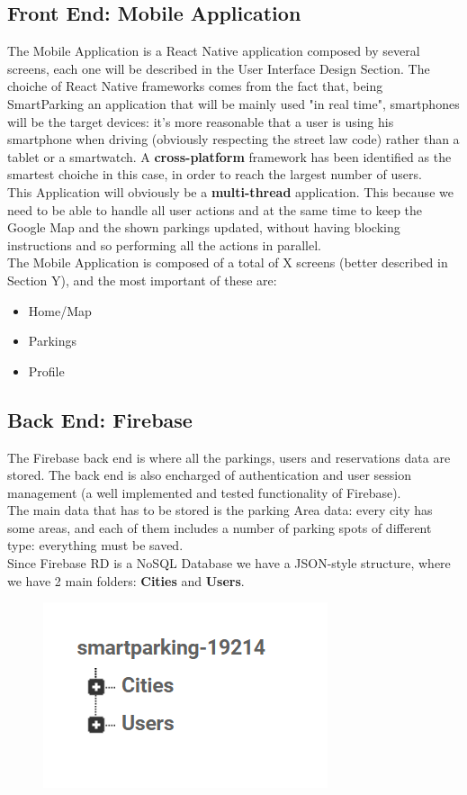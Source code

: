 \documentclass[11pt]{article} %
\begin{document}
\subsection{Front End: Mobile Application}
The Mobile Application is a React Native application composed by several screens, each one will be described in the User Interface Design Section. The choiche of React Native frameworks comes from the fact that, being SmartParking an application that will be mainly used "in real time", smartphones will be the target devices: it's more reasonable that a user is using his smartphone when driving (obviously respecting the street law code) rather than a tablet or a smartwatch. A \textbf{cross-platform} framework has been identified as the smartest choiche in this case, in order to reach the largest number of users.\\
This Application will obviously be a \textbf{multi-thread} application. This because we need to be able to handle all user actions and at the same time to keep the Google Map and the shown parkings updated, without having blocking instructions and so performing all the actions in parallel.\\
The Mobile Application is composed of a total of X screens (better described in Section Y), and the most important of these are:
\begin{itemize}
\item {Home/Map}
\item {Parkings}
\item {Profile}
\end{itemize}

\subsection{Back End: Firebase}
The Firebase back end is where all the parkings, users and reservations data are stored. The back end is also encharged of authentication and user session management (a well implemented and tested functionality of Firebase). \\
The main data that has to be stored is the parking Area data: every city has some areas, and each of them includes a number of parking spots of different type: everything must be saved. \\
Since Firebase RD is a NoSQL Database we have a JSON-style structure, where we have 2 main folders: \textbf{Cities} and \textbf{Users}. 
\begin{figure}[H]
\centering
\includegraphics[scale=1]{db_general.png}
\end{figure}
\end{document}
